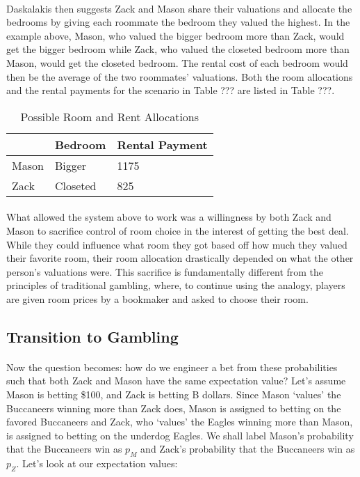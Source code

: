 \documentclass[12pt,letterpaper]{article}
\begin{document}
\paragraph{} Daskalakis then suggests Zack and Mason share their valuations and allocate the bedrooms by giving each roommate the bedroom they valued the highest. In the example above, Mason, who valued the bigger bedroom more than Zack, would get the bigger bedroom while Zack, who valued the closeted bedroom more than Mason, would get the closeted bedroom. The rental cost of each bedroom would then be the average of the two roommates’ valuations. Both the room allocations and the rental payments for the scenario in Table ??? are listed in Table ???. 

\begin{center}
	\begin{table}[h]
	\begin{tabular}{ | P{4.6cm} | P{4.6cm} | P{4.6cm} |}
	\hline
	& Bedroom & Rental Payment \\ 
	\hline
	Mason & Bigger & 1175 \\  
	\hline
	Zack & Closeted & 825 \\ 
	\hline
	\end{tabular}
	\caption{\label{demo-table}Possible Room and Rent Allocations}
	\end{table}
\end{center}
\vspace{-25pt}

\paragraph{} What allowed the system above to work was a willingness by both Zack and Mason to sacrifice control of room choice in the interest of getting the best deal. While they could influence what room they got based off how much they valued their favorite room, their room allocation drastically depended on what the other person’s valuations were. This sacrifice is fundamentally different from the principles of traditional gambling, where, to continue using the analogy, players are given room prices by a bookmaker and asked to choose their room.

\subsection{Transition to Gambling}

\paragraph{} Now the question becomes: how do we engineer a bet from these probabilities such that both Zack and Mason have the same expectation value? Let’s assume Mason is betting \$100, and Zack is betting B dollars. Since Mason ‘values’ the Buccaneers winning more than Zack does, Mason is assigned to betting on the favored Buccaneers and Zack, who ‘values’ the Eagles winning more than Mason, is assigned to betting on the underdog Eagles. We shall label Mason’s probability that the Buccaneers win as $p_M$ and Zack’s probability that the Buccaneers win as $p_Z$. Let’s look at our expectation values:
\end{document}
